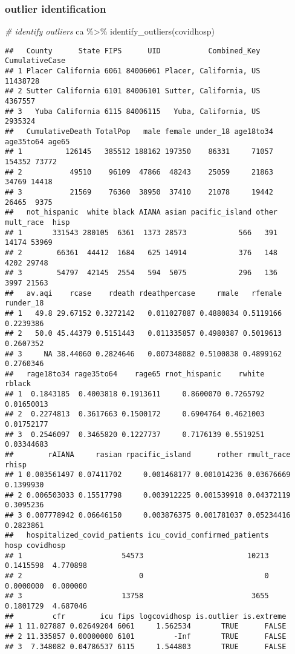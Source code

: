 \documentclass[
]{article}
\newenvironment{Shaded}{\begin{snugshade}}{\end{snugshade}}
\newcommand{\CommentTok}[1]{\textcolor[rgb]{0.56,0.35,0.01}{\textit{#1}}}
\newcommand{\FunctionTok}[1]{\textcolor[rgb]{0.00,0.00,0.00}{#1}}
\newcommand{\NormalTok}[1]{#1}
\newcommand{\SpecialCharTok}[1]{\textcolor[rgb]{0.00,0.00,0.00}{#1}}
\begin{document}
\hypertarget{outlier-identification}{%
\subsubsection{outlier identification}\label{outlier-identification}}

\begin{Shaded}
\begin{Highlighting}[]
\CommentTok{\# identify outliers}
\NormalTok{ca }\SpecialCharTok{\%\textgreater{}\%} \FunctionTok{identify\_outliers}\NormalTok{(covidhosp)}
\end{Highlighting}
\end{Shaded}

\begin{verbatim}
##   County      State FIPS      UID           Combined_Key CumulativeCase
## 1 Placer California 6061 84006061 Placer, California, US       11438728
## 2 Sutter California 6101 84006101 Sutter, California, US        4367557
## 3   Yuba California 6115 84006115   Yuba, California, US        2935324
##   CumulativeDeath TotalPop   male female under_18 age18to34 age35to64 age65
## 1          126145   385512 188162 197350    86331     71057    154352 73772
## 2           49510    96109  47866  48243    25059     21863     34769 14418
## 3           21569    76360  38950  37410    21078     19442     26465  9375
##   not_hispanic  white black AIANA asian pacific_island other mult_race  hisp
## 1       331543 280105  6361  1373 28573            566   391     14174 53969
## 2        66361  44412  1684   625 14914            376   148      4202 29748
## 3        54797  42145  2554   594  5075            296   136      3997 21563
##   av.aqi    rcase    rdeath rdeathpercase     rmale   rfemale runder_18
## 1   49.8 29.67152 0.3272142   0.011027887 0.4880834 0.5119166 0.2239386
## 2   50.0 45.44379 0.5151443   0.011335857 0.4980387 0.5019613 0.2607352
## 3     NA 38.44060 0.2824646   0.007348082 0.5100838 0.4899162 0.2760346
##   rage18to34 rage35to64    rage65 rnot_hispanic    rwhite     rblack
## 1  0.1843185  0.4003818 0.1913611     0.8600070 0.7265792 0.01650013
## 2  0.2274813  0.3617663 0.1500172     0.6904764 0.4621003 0.01752177
## 3  0.2546097  0.3465820 0.1227737     0.7176139 0.5519251 0.03344683
##        rAIANA     rasian rpacific_island      rother rmult_race     rhisp
## 1 0.003561497 0.07411702     0.001468177 0.001014236 0.03676669 0.1399930
## 2 0.006503033 0.15517798     0.003912225 0.001539918 0.04372119 0.3095236
## 3 0.007778942 0.06646150     0.003876375 0.001781037 0.05234416 0.2823861
##   hospitalized_covid_patients icu_covid_confirmed_patients      hosp covidhosp
## 1                       54573                        10213 0.1415598  4.770898
## 2                           0                            0 0.0000000  0.000000
## 3                       13758                         3655 0.1801729  4.687046
##         cfr        icu fips logcovidhosp is.outlier is.extreme
## 1 11.027887 0.02649204 6061     1.562534       TRUE      FALSE
## 2 11.335857 0.00000000 6101         -Inf       TRUE      FALSE
## 3  7.348082 0.04786537 6115     1.544803       TRUE      FALSE
\end{verbatim}
\end{document}
